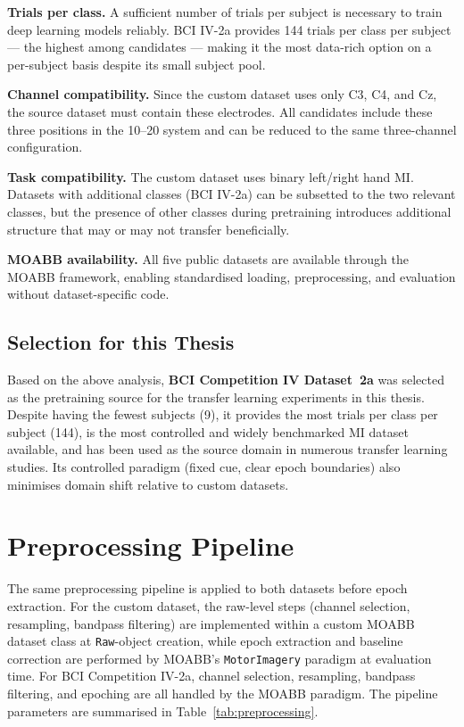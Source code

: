 \documentclass[english, bc, kiv, he, iso690alph, pdf]{fasthesis}
\begin{document}
\textbf{Trials per class.} A sufficient number of trials per subject is necessary to train deep learning models reliably. BCI IV-2a provides 144 trials per class per subject — the highest among candidates — making it the most data-rich option on a per-subject basis despite its small subject pool.

\textbf{Channel compatibility.} Since the custom dataset uses only C3, C4, and Cz, the source dataset must contain these electrodes. All candidates include these three positions in the 10--20 system and can be reduced to the same three-channel configuration.

\textbf{Task compatibility.} The custom dataset uses binary left/right hand MI. Datasets with additional classes (BCI IV-2a) can be subsetted to the two relevant classes, but the presence of other classes during pretraining introduces additional structure that may or may not transfer beneficially.

\textbf{MOABB availability.} All five public datasets are available through the MOABB framework, enabling standardised loading, preprocessing, and evaluation without dataset-specific code.

\subsection{Selection for this Thesis}

Based on the above analysis, \textbf{BCI Competition IV Dataset~2a} was selected as the pretraining source for the transfer learning experiments in this thesis. Despite having the fewest subjects (9), it provides the most trials per class per subject (144), is the most controlled and widely benchmarked MI dataset available, and has been used as the source domain in numerous transfer learning studies. Its controlled paradigm (fixed cue, clear epoch boundaries) also minimises domain shift relative to custom datasets.


\section{Preprocessing Pipeline}

The same preprocessing pipeline is applied to both datasets before epoch extraction. For the custom dataset, the raw-level steps (channel selection, resampling, bandpass filtering) are implemented within a custom MOABB dataset class at \texttt{Raw}-object creation, while epoch extraction and baseline correction are performed by MOABB's \texttt{MotorImagery} paradigm at evaluation time. For BCI Competition IV-2a, channel selection, resampling, bandpass filtering, and epoching are all handled by the MOABB paradigm. The pipeline parameters are summarised in Table~\ref{tab:preprocessing}.
\end{document}
